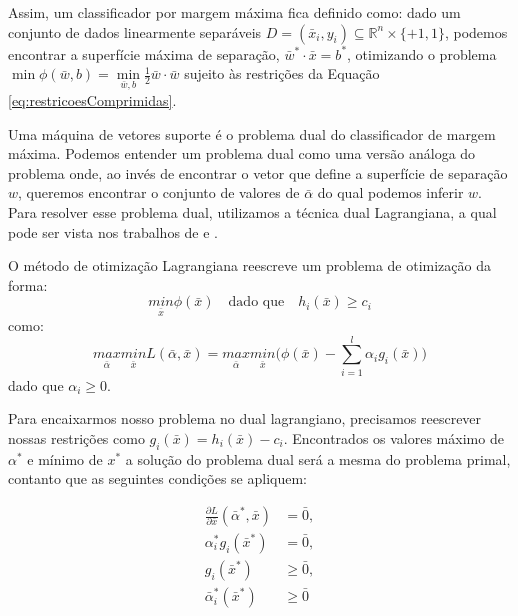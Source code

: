 Assim, um classificador por margem máxima fica definido como: dado um conjunto de dados linearmente separáveis $D=(\bar{x}_i,y_i) \subseteq \mathbb{R}^n\times\{+1,1\}$, podemos encontrar a superfície máxima de separação, $\bar{w}^*\cdot\bar{x}=b^*$, otimizando o problema $\min\phi(\bar{w},b)=\underset{\bar{w},b}{\min}\frac{1}{2}\bar{w}\cdot\bar{w}$ sujeito às restrições da Equação \ref{eq:restricoesComprimidas}.
\par

Uma máquina de vetores suporte é o problema dual do classificador de margem máxima. Podemos entender um problema dual como uma versão análoga do problema onde, ao invés de encontrar o vetor que define a superfície de separação $w$, queremos encontrar o conjunto de valores de $\bar{\alpha}$ do qual podemos inferir $w$. Para resolver esse problema dual, utilizamos a técnica dual Lagrangiana, a qual pode ser vista nos trabalhos de \cite{art:LIVRO_SVM} e \cite{art:LIVRO_KAA}.

O método de otimização Lagrangiana reescreve um problema de otimização da forma:
\begin{equation}
\underset{\bar{x}}{min}\phi(\bar{x}) \quad \text{dado que} \quad h_i(\bar{x})\ge c_i
\end{equation}
como:
\begin{equation}
\underset{\bar{\alpha}}{max} \underset{\bar{x}}{min} L(\bar{\alpha},\bar{x}) = \underset{\bar{\alpha}}{max} \underset{\bar{x}}{min}\bigg(\phi(\bar{x})-\sum_{i=1}^{l}\alpha_i g_i(\bar{x})\bigg)
    \label{eq:LABEL_EQ_7}
\end{equation}
dado que $\alpha_i\ge0$.

Para encaixarmos nosso problema no dual lagrangiano, precisamos reescrever nossas restrições como $g_i(\bar{x})=h_i(\bar{x})-c_i$. Encontrados os valores máximo de $\alpha^*$ e mínimo de $x^*$ a solução do problema dual será a mesma do problema primal, contanto que as seguintes condições se apliquem:

\begin{equation}
\begin{split}
\frac{\partial L}{\partial \bar{x}}(\bar{\alpha}^*,\bar{x})&=\bar{0}, \\
\alpha_i^*g_i(\bar{x}^*)&=\bar{0}, \\
g_i(\bar{x}^*)&\ge\bar{0} , \\
\bar{\alpha}_i^*(\bar{x}^*)&\ge\bar{0} 
\end{split}
\end{equation}


